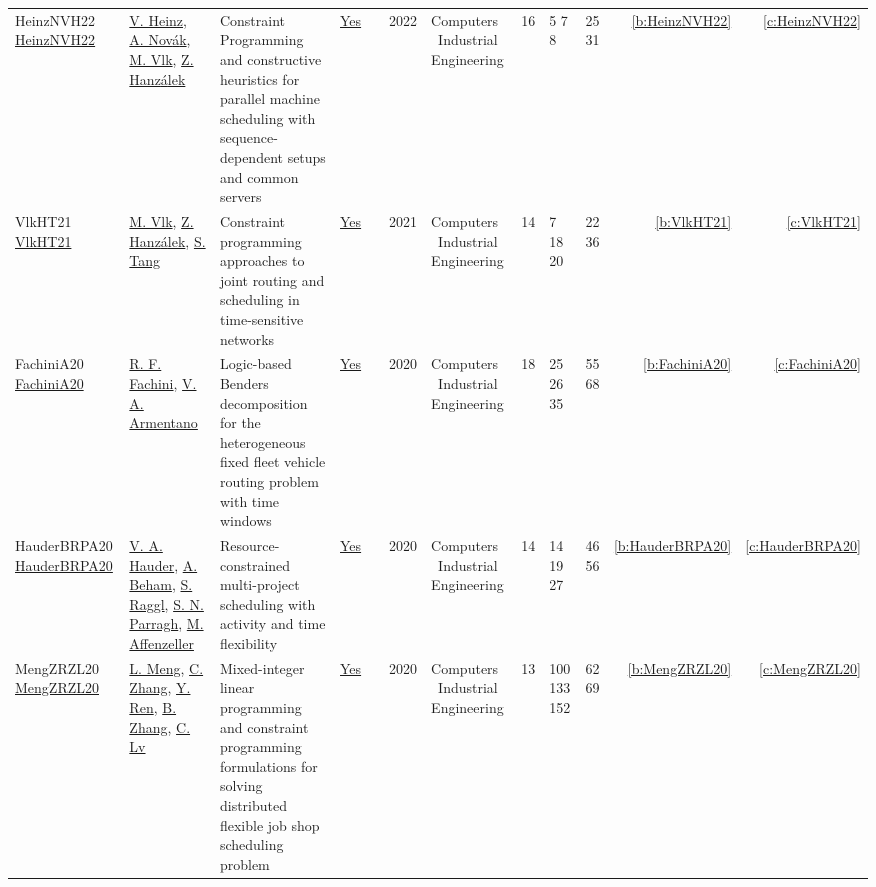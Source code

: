 {\begin{longtable}{>{\raggedright\arraybackslash}p{3cm}>{\raggedright\arraybackslash}p{4.5cm}>{\raggedright\arraybackslash}p{6.0cm}rrrp{2.5cm}rp{1cm}p{1cm}rr}
HeinzNVH22 \href{https://doi.org/10.1016/j.cie.2022.108586}{HeinzNVH22} & \hyperref[auth:a433]{V. Heinz}, \hyperref[auth:a434]{A. Nov{\'{a}}k}, \hyperref[auth:a311]{M. Vlk}, \hyperref[auth:a116]{Z. Hanz{\'{a}}lek} & \cellcolor{green!10}Constraint Programming and constructive heuristics for parallel machine scheduling with sequence-dependent setups and common servers & \href{../works/HeinzNVH22.pdf}{Yes} & \cite{HeinzNVH22} & 2022 & Computers \  Industrial Engineering & 16 & 5 7 8 & 25 31 & \ref{b:HeinzNVH22} & \ref{c:HeinzNVH22}\\
VlkHT21 \href{https://doi.org/10.1016/j.cie.2021.107317}{VlkHT21} & \hyperref[auth:a311]{M. Vlk}, \hyperref[auth:a116]{Z. Hanz{\'{a}}lek}, \hyperref[auth:a475]{S. Tang} & Constraint programming approaches to joint routing and scheduling in time-sensitive networks & \href{../works/VlkHT21.pdf}{Yes} & \cite{VlkHT21} & 2021 & Computers \  Industrial Engineering & 14 & 7 18 20 & 22 36 & \ref{b:VlkHT21} & \ref{c:VlkHT21}\\
FachiniA20 \href{http://dx.doi.org/10.1016/j.cie.2020.106641}{FachiniA20} & \hyperref[auth:a1024]{R. F. Fachini}, \hyperref[auth:a1025]{V. A. Armentano} & Logic-based Benders decomposition for the heterogeneous fixed fleet vehicle routing problem with time windows & \href{../works/FachiniA20.pdf}{Yes} & \cite{FachiniA20} & 2020 & Computers \  Industrial Engineering & 18 & 25 26 35 & 55 68 & \ref{b:FachiniA20} & \ref{c:FachiniA20}\\
HauderBRPA20 \href{http://dx.doi.org/10.1016/j.cie.2020.106857}{HauderBRPA20} & \hyperref[auth:a550]{V. A. Hauder}, \hyperref[auth:a551]{A. Beham}, \hyperref[auth:a552]{S. Raggl}, \hyperref[auth:a553]{S. N. Parragh}, \hyperref[auth:a554]{M. Affenzeller} & \cellcolor{green!10}Resource-constrained multi-project scheduling with activity and time flexibility & \href{../works/HauderBRPA20.pdf}{Yes} & \cite{HauderBRPA20} & 2020 & Computers \  Industrial Engineering & 14 & 14 19 27 & 46 56 & \ref{b:HauderBRPA20} & \ref{c:HauderBRPA20}\\
MengZRZL20 \href{https://doi.org/10.1016/j.cie.2020.106347}{MengZRZL20} & \hyperref[auth:a500]{L. Meng}, \hyperref[auth:a501]{C. Zhang}, \hyperref[auth:a502]{Y. Ren}, \hyperref[auth:a503]{B. Zhang}, \hyperref[auth:a504]{C. Lv} & Mixed-integer linear programming and constraint programming formulations for solving distributed flexible job shop scheduling problem & \href{../works/MengZRZL20.pdf}{Yes} & \cite{MengZRZL20} & 2020 & Computers \  Industrial Engineering & 13 & 100 133 152 & 62 69 & \ref{b:MengZRZL20} & \ref{c:MengZRZL20}\\

\end{longtable}}
